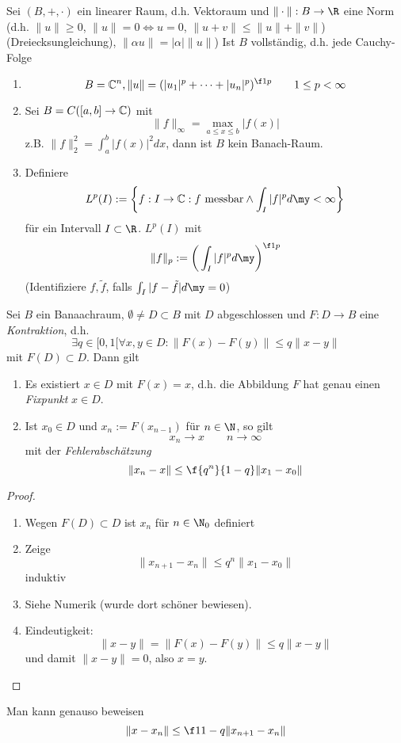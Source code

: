 \documentclass[a4paper,10pt]{scrbook}
\begin{document}
\begin{def} \label{1.1}
	Sei $(B,+,\cdot)$ ein linearer Raum, d.h. Vektoraum und $\|\cdot\|: B \to \R$ eine Norm (d.h. $\|u\| \ge 0$, $\|u\|=0 \iff u = 0$, $\|u+v\| \le \|u\| + \|v\|$) (Dreiecksungleichung), $\|\alpha u \| = |\alpha| \|u\|$)
	Ist $B$ vollständig, d.h. jede Cauchy-Folge 
\end{def}

\begin{ex} \label{1.2}
	\begin{enumerate}[1)]
		\item
			\[
				B = \C^n, \|u\| = (|u_1|^p + \dotsb + |u_n|^p)^{\f 1p} \qquad 1 \le p < \infty
			\]
		\item
			Sei $B = C([a,b] \to \mathbb{C})$ mit
			\[
				\|f\|_\infty = \max_{a \le x \le b} |f(x)|
			\]
			z.B. $\|f\|_2^2 = \int_a^b |f(x)|^2 dx$, dann ist $B$ kein Banach-Raum.
		\item
			Definiere
			\[
				L^p(I) := \bigg\{ f : I \to \C : f \text{ messbar} \land \int_I |f|^p d\my < \infty \bigg\}
			\]
			für ein Intervall $I \subset \R$.
			$L^p(I)$ mit
			\[
				\|f\|_p := \bigg( \int_I |f|^p d\my \bigg)^{\f 1p}
			\]
			(Identifiziere $f,\tilde f$, falls $\int_I |f-\tilde f| d\my = 0$)
	\end{enumerate}
\end{ex}


\begin{st} \label{1.3}
	Sei $B$ ein Banaachraum, $\emptyset \neq D \subset B$ mit $D$ abgeschlossen und $F: D \to B$ eine \emph{Kontraktion}, d.h.
	\[
		\exists q \in [0,1[ \forall x,y \in D : \|F(x) - F(y)\| \le q\|x-y\|
	\]
	mit $F(D) \subset D$. Dann gilt
	\begin{enumerate}[1)]
		\item
			Es existiert $x\in D$ mit $F(x)=x$, d.h. die Abbildung $F$ hat genau einen \emph{Fixpunkt} $x\in D$.
		\item
			Ist $x_0 \in D$ und $x_n := F(x_{n-1})$ für $n\in \N$, so gilt
			\[
				x_n \to x \qquad n \to \infty
			\]
			mit der \emph{Fehlerabschätzung}
			\[
				\|x_n - x\| \le \f{q^n}{1-q} \|x_1 - x_0\|
			\]
	\end{enumerate}
	\begin{proof}
		\begin{enumerate}[1)]
			\item
				Wegen $F(D) \subset D$ ist $x_n$ für $n\in \N_0$ definiert
			\item
				Zeige 
				\[
					\|x_{n+1} - x_n\| \le q^n \|x_1 - x_0\|
				\]
				induktiv
			\item
				Siehe Numerik (wurde dort schöner bewiesen).
			\item
				Eindeutigkeit:
				\[
					\|x-y\| = \|F(x) - F(y)\| \le q \|x-y\|
				\]
				und damit $\|x-y\| = 0$, also $x=y$.
		\end{enumerate}
	\end{proof}
\end{st}

\begin{nt} \label{1.4}
	Man kann genauso beweisen
	\[
		\|x - x_n\| \le \f 1{1-q} \|x_{n+1} -x_n \|
	\]
\end{nt}
\end{document}
